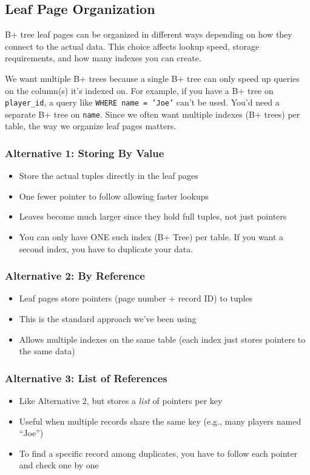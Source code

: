 \subsection{Leaf Page Organization}

B+ tree leaf pages can be organized in different ways depending on how they connect to the actual data. This choice affects lookup speed, storage requirements, and how many indexes you can create.

We want multiple B+ trees because a single B+ tree can only speed up queries on the column(s) it's indexed on. For example, if you have a B+ tree on \texttt{player\_id}, a query like \texttt{WHERE name = 'Joe'} can't be used. You'd need a separate B+ tree on \texttt{name}. Since we often want multiple indexes (B+ trees) per table, the way we organize leaf pages matters.


\subsubsection*{Alternative 1: Storing By Value}
\begin{itemize}
    \item Store the actual tuples directly in the leaf pages
    \item One fewer pointer to follow allowing faster lookups
    \item Leaves become much larger since they hold full tuples, not just pointers
    \item You can only have ONE such index (B+ Tree) per table. If you want a second index, you have to duplicate your data.
\end{itemize}

\subsubsection*{Alternative 2: By Reference}
\begin{itemize}
    \item Leaf pages store pointers (page number + record ID) to tuples
    \item This is the standard approach we've been using
    \item Allows multiple indexes on the same table  (each index just stores pointers to the same data)
\end{itemize}

\subsubsection*{Alternative 3: List of References}
\begin{itemize}
    \item Like Alternative 2, but stores a \textit{list} of pointers per key
    \item Useful when multiple records share the same key (e.g., many players named ``Joe'')
    \item To find a specific record among duplicates, you have to follow each pointer and check one by one
\end{itemize}

